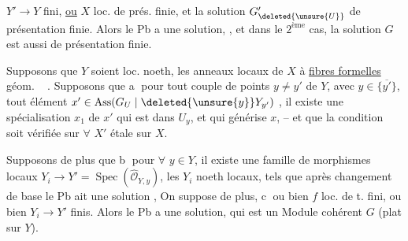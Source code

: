 $Y'\to Y$ fini, \uline{ou} $X$ loc. de prés. finie, et la solution
$G'_{\deleted{\unsure{U}}}$ de présentation finie. Alors le Pb a une solution,
, et dans le $2^{\text{ème}}$ cas, la solution $G$ est aussi
de présentation finie.


\noindent{}\quad{}
Supposons que   $Y$  soient loc. noeth,
les anneaux locaux de $X$ à \uline{fibres formelles} géom. \  .
Supposons que \textcircled{a} pour tout couple de points $y\ne y'$ de $Y$, avec $y\in\overline{\{y'\}}$,
 tout élément   $x'\in\operatorname{Ass}(G_U\mid\deleted{\unsure{y}}Y_{y'})$ , il
existe une spécialisation $x_1$ de $x'$  qui est dans $U_y$,
et qui générise $x$, -- et que la  condition soit vérifiée sur $\forall$ $X'$ étale sur $X$.


Supposons de plus que \textcircled{b} pour $\forall$ $y\in Y$, il existe une
famille de morphismes locaux $Y_i\to Y'=\operatorname{Spec}(\widehat{\mathcal O}_{Y,y})$,
les $Y_i$ noeth locaux,
tels que après changement de base le Pb ait une
solution  ,  
On suppose de plus, \textcircled{c} ou bien $f$
loc.  de t. fini, ou  bien $Y_i\to Y'$ finis. Alors le
Pb a une solution, qui est un Module cohérent
$G$ (plat sur $Y$).


